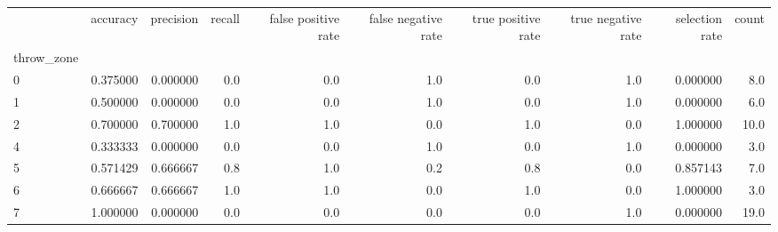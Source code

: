 \begin{tabular}{lrrrrrrrrr}
\toprule
{} &  accuracy &  precision &  recall &  false positive rate &  false negative rate &  true positive rate &  true negative rate &  selection rate &  count \\
throw\_zone &           &            &         &                      &                      &                     &                     &                 &        \\
\midrule
0          &  0.375000 &   0.000000 &     0.0 &                  0.0 &                  1.0 &                 0.0 &                 1.0 &        0.000000 &    8.0 \\
1          &  0.500000 &   0.000000 &     0.0 &                  0.0 &                  1.0 &                 0.0 &                 1.0 &        0.000000 &    6.0 \\
2          &  0.700000 &   0.700000 &     1.0 &                  1.0 &                  0.0 &                 1.0 &                 0.0 &        1.000000 &   10.0 \\
4          &  0.333333 &   0.000000 &     0.0 &                  0.0 &                  1.0 &                 0.0 &                 1.0 &        0.000000 &    3.0 \\
5          &  0.571429 &   0.666667 &     0.8 &                  1.0 &                  0.2 &                 0.8 &                 0.0 &        0.857143 &    7.0 \\
6          &  0.666667 &   0.666667 &     1.0 &                  1.0 &                  0.0 &                 1.0 &                 0.0 &        1.000000 &    3.0 \\
7          &  1.000000 &   0.000000 &     0.0 &                  0.0 &                  0.0 &                 0.0 &                 1.0 &        0.000000 &   19.0 \\
\bottomrule
\end{tabular}
